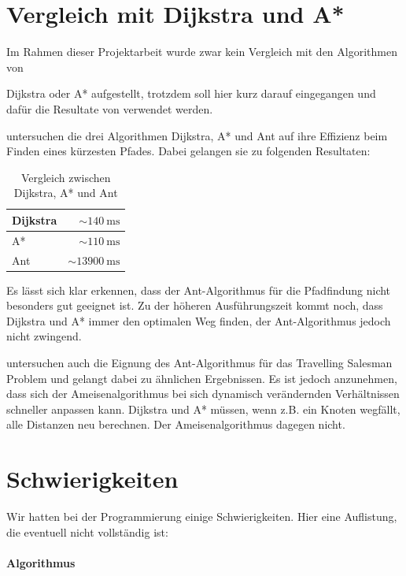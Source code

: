 \section{Vergleich mit Dijkstra und A*}

Im Rahmen dieser Projektarbeit wurde zwar kein Vergleich mit den Algorithmen von

Dijkstra oder A* aufgestellt, trotzdem soll hier kurz darauf eingegangen und
dafür
die Resultate von \citet*{leo-perf} verwendet werden.

\citeauthor*{leo-perf} untersuchen die drei Algorithmen Dijkstra, A* und Ant auf
ihre Effizienz beim Finden eines kürzesten Pfades. Dabei gelangen sie zu
folgenden
Resultaten:

\begin{table}[h] \begin{tabular}{ | l | r | } \hline Dijkstra &
$\sim\SI{140}{\milli\s}$ \\ \hline A* & $\sim\SI{110}{\milli\s}$ \\ \hline Ant &
$\sim\SI{13900}{\milli\s}$  \\ \hline \end{tabular} \caption{Vergleich zwischen
Dijkstra, A* und Ant} \end{table}

\noindent Es lässt sich klar erkennen, dass der Ant-Algorithmus für die
Pfadfindung nicht besonders gut geeignet ist. Zu der höheren Ausführungszeit
kommt noch, dass Dijkstra und A* immer den optimalen Weg finden, der
Ant-Algorithmus jedoch nicht zwingend.

\citeauthor*{leo-perf} untersuchen auch die Eignung des Ant-Algorithmus für das
Travelling Salesman Problem und gelangt dabei zu ähnlichen Ergebnissen. Es ist
jedoch anzunehmen, dass sich der Ameisenalgorithmus bei sich dynamisch
verändernden Verhältnissen schneller anpassen kann. Dijkstra und A* müssen, wenn
z.B. ein Knoten wegfällt, alle Distanzen neu berechnen. Der Ameisenalgorithmus
dagegen nicht.

\section{Schwierigkeiten}

Wir hatten bei der Programmierung einige Schwierigkeiten. Hier eine Auflistung,
die eventuell nicht vollständig ist:

\paragraph*{Algorithmus}

